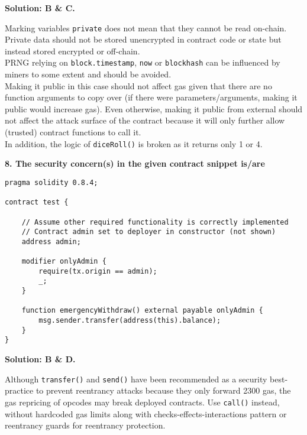 \textbf{Solution: B \& C.}

Marking variables \verb|private| does not mean that they cannot be read on-chain.
Private data should not be stored unencrypted in contract code or state but instead stored encrypted or off-chain.\\

PRNG relying on \verb|block.timestamp|, \verb|now| or \verb|blockhash| can be influenced by miners to some extent and should be avoided.\\

Making it public in this case should not affect gas given that there are no function arguments to copy over (if there were parameters/arguments, making it public would increase gas).
Even otherwise, making it public from external should not affect the attack surface of the contract because it will only further allow (trusted) contract functions to call it.\\

In addition, the logic of \verb|diceRoll()| is broken as it returns only 1 or 4.\\

\pagebreak

\textbf{8. The security concern(s) in the given contract snippet is/are}\label{sec:exam4_q8}\\

\begin{lstlisting}[language=Solidity, style=solStyle]
pragma solidity 0.8.4;

contract test {

    // Assume other required functionality is correctly implemented
    // Contract admin set to deployer in constructor (not shown)
    address admin;

    modifier onlyAdmin {
        require(tx.origin == admin);
        _;
    }

    function emergencyWithdraw() external payable onlyAdmin {
        msg.sender.transfer(address(this).balance);
    }
}
\end{lstlisting}

\textbf{Solution: B \& D.}

Although \verb|transfer()| and \verb|send()| have been recommended as a security best-practice to prevent reentrancy attacks because they only forward 2300 gas, the gas repricing of opcodes may break deployed contracts.
Use \verb|call()| instead, without hardcoded gas limits along with checks-effects-interactions pattern or reentrancy guards for reentrancy protection.\\

